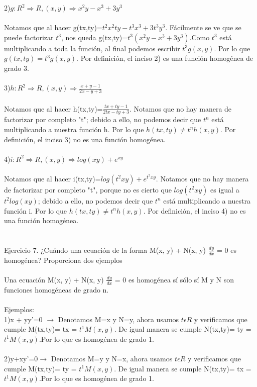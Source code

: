 \documentclass[a4paper,10pt]{article}
\begin{document}
2)$ g: R^2 \Rightarrow R, (x,y) \Rightarrow x^2y-x^3 + 3y^3$\\\\Notamos que al hacer g(tx,ty)=$t^2 x^2 ty - t^3 x^3 + 3t^3y^3$. Fácilmente se ve que se puede factorizar $t^3$, nos queda g(tx,ty)=$t^3( x^2 y -  x^3 + 3y^3)$.Como $t^3$ está multiplicando a toda la función, al final podemos escribir $t^3 g(x,y)$. Por lo que $g(tx,ty)= t^3 g(x,y)$. Por definición, el inciso 2) es una función homogénea de grado 3.\\\\
3)$h: R^2 \Rightarrow R, (x,y) \Rightarrow \frac{x+y-1}{2x-y+3} $\\\\
Notamos que al hacer h(tx,ty)=$\frac{tx+ty-1}{2tx-ty+3}$. Notamos que no hay manera de factorizar por completo "t"; debido a ello, no podemos decir que $t^n$ está multiplicando a nuestra función h. Por lo que $h(tx,ty)\neq t^n h(x,y)$. Por definición, el inciso 3) no es una función homogénea.\\\\
4)$i: R^2 \Rightarrow R, (x,y) \Rightarrow log(xy)+ e^{xy}$\\\\
Notamos que al hacer i(tx,ty)=$log(t^2xy)+ e^{t^2xy}$. Notamos que no hay manera de factorizar por completo "t", porque no es cierto que $log(t^2xy)$ es igual a $t^2 log(xy)$; debido a ello, no podemos decir que $t^n$ está multiplicando a nuestra función i. Por lo que $h(tx,ty)\neq t^n h(x,y)$. Por definición, el inciso 4) no es una función homogénea.\\\\\\
Ejercicio 7. ¿Cuándo una ecuación de la forma M(x, y) + N(x, y)
$\frac{dy}{dx}$ = 0 es homogénea? Proporciona dos ejemplos\\\\
Una ecuación M(x, y) + N(x, y) $\frac{dy}{dx}$ = 0 es homogénea sí sólo sí M y N son funciones homogéneas de grado n.\\\\
Ejemplos:\\
1)x + yy'=0 $\rightarrow$ Denotamos M=x y N=y, ahora usamos $t\epsilon R$ y verificamos que cumple M(tx,ty)= tx = $t^1 M(x,y)$. De igual manera se cumple N(tx,ty)= ty = $t^1 M(x,y)$.Por lo que es homogénea de grado 1.\\\\
2)y+xy'=0$\rightarrow$ Denotamos M=y y N=x, ahora usamos $t\epsilon R$ y verificamos que cumple M(tx,ty)= ty = $t^1 M(x,y)$. De igual manera se cumple N(tx,ty)= tx = $t^1 M(x,y)$.Por lo que es homogénea de grado 1.\\\\\\
\end{document}
